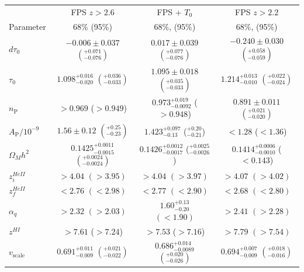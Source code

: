 \begin{table}
	\centering
      \def\arraystretch{1.6}
\begin{tabular} {| l | c | c | c|}
\hline
 & FPS $z>2.6$ & FPS + $T_0$ & FPS $z>2.2$ \\
Parameter & 68\% (95\%) & 68\%, (95\%) & 68\%, (95\%)
\\
\hline
$d\tau_0        $ & $-0.006\pm 0.037$  $\left(^{+0.071}_{-0.076}\right)$                   & $0.017\pm 0.039$            $\left(^{+0.077}_{-0.076}\right)$                   & $-0.240\pm 0.030$     $\left(^{+0.058}_{-0.059}  \right)$   \\
$\tau_0         $ & $1.098^{+0.016}_{-0.020}$  $\left( ^{+0.036}_{-0.033}\right)$            & $1.095\pm 0.018$       $\left(^{+0.035}_{-0.033}\right)$                   & $1.214^{+0.013}_{-0.010}$   $\left(^{+0.022}_{-0.024}\right)$   \\
$n_\mathrm{P}   $ & $> 0.969                   $  ($> 0.949                   $)  & $0.973^{+0.019}_{-0.0092}$  ($> 0.948   $)    & $0.891\pm 0.011$            $\left(^{+0.021}_{-0.020}\right)$   \\
$A_\mathrm{P}/10^{-9}$ & $1.56\pm 0.12$        $\left(^{+0.25}_{-0.23}\right)$        & $1.423^{+0.097}_{-0.13}$   ($^{+0.20}_{-0.21}$)                   &           $< 1.28 $  ($< 1.36$)   \\
$\Omega_M h^2   $ & $0.1425^{+0.0011}_{-0.0015}$ $(^{+0.0024}_{-0.0024})$       & $0.1426^{+0.0012}_{-0.0017}$  ($^{+0.0025}_{-0.0026}$)                  & $0.1414^{+0.0006}_{-0.0010}$ ($< 0.143$)   \\
$z^{HeII}_i     $ & $> 4.04                    $ $(> 3.95)                    $  & $> 4.04$   $(> 3.97 ) $    & $> 4.07                    $  $(> 4.02)$   \\
$z^{HeII}_f     $ & $< 2.76                    $  $(< 2.98)$                   & $< 2.77$  $(< 2.90)$           & $< 2.68                    $    $(< 2.80 )$   \\
$\alpha_{q}     $ & $> 2.32                    $  $(> 2.03)$                   & $1.60^{+0.13}_{-0.20}$  $(< 1.90 )$              & $> 2.41                    $    $(> 2.28 )                   $   \\
$z^{HI}         $ & $> 7.61                    $ ($> 7.24 $)                    & $> 7.53$ ($> 7.16 $)                            & $> 7.79                    $    $(> 7.54 )$   \\
$v_\mathrm{scale}$ & $0.691^{+0.011}_{-0.009}  $  $\left(^{+0.021}_{-0.022}\right)$    & $0.686^{+0.014}_{-0.0089}$  $\left(^{+0.020}_{-0.026}\right)$    & $0.694^{+0.007}_{-0.009}$  $\left(^{+0.018}_{-0.016} \right)$     \\

\end{tabular}
\end{table}
